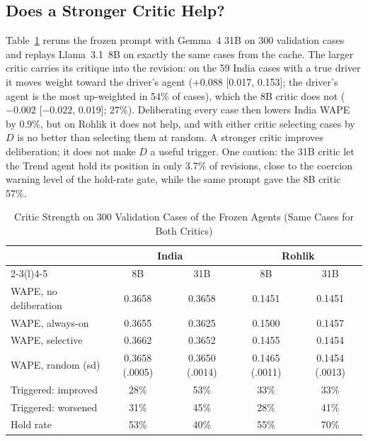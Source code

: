 \documentclass[conference]{IEEEtran}
\begin{document}
\subsection{Does a Stronger Critic Help?}
Table~\ref{tab:critic} reruns the frozen prompt with Gemma~4 31B on 300 validation cases and replays
Llama~3.1~8B on exactly the same cases from the cache. The larger critic carries its critique into
the revision: on the 59 India cases with a true driver it moves weight toward the driver's agent
($+0.088$ [0.017, 0.153]; the driver's agent is the most up-weighted in 54\% of cases), which the 8B
critic does not ($-0.002$ [$-0.022$, 0.019]; 27\%). Deliberating every case then lowers India WAPE
by 0.9\%, but on Rohlik it does not help, and with either critic selecting cases by $D$ is no better
than selecting them at random. A stronger critic improves deliberation; it does not make $D$ a
useful trigger. One caution: the 31B critic let the Trend agent hold its position in only 3.7\% of
revisions, close to the coercion warning level of the hold-rate gate, while the same prompt gave the
8B critic 57\%.

\begin{table}[t]
\caption{Critic Strength on 300 Validation Cases of the Frozen Agents (Same Cases for Both Critics)}
\label{tab:critic}
\centering
\scriptsize
\setlength{\tabcolsep}{2.5pt}
\begin{tabular}{@{}lcccc@{}}
\toprule
 & \multicolumn{2}{c}{India} & \multicolumn{2}{c}{Rohlik} \\
\cmidrule(lr){2-3}\cmidrule(l){4-5}
 & 8B & 31B & 8B & 31B \\
\midrule
WAPE, no deliberation   & 0.3658 & 0.3658 & 0.1451 & 0.1451 \\
WAPE, always-on         & 0.3655 & 0.3625 & 0.1500 & 0.1457 \\
WAPE, selective         & 0.3662 & 0.3652 & 0.1455 & 0.1454 \\
WAPE, random (sd)       & 0.3658 (.0005) & 0.3650 (.0014) & 0.1465 (.0011) & 0.1454 (.0013) \\
Triggered: improved     & 28\% & 53\% & 33\% & 33\% \\
Triggered: worsened     & 31\% & 45\% & 28\% & 41\% \\
Hold rate               & 53\% & 40\% & 55\% & 70\% \\
\bottomrule
\end{tabular}
\end{table}
\end{document}
